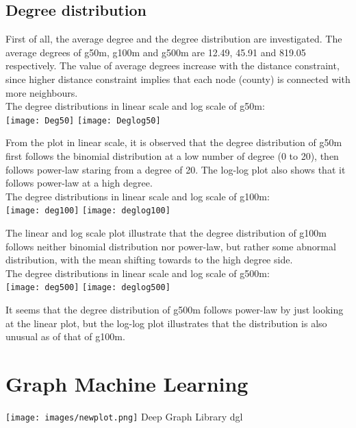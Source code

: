 \subsection{Degree distribution}
First of all, the average degree and the degree distribution are investigated. The average degrees of g50m, g100m and g500m are 12.49, 45.91 and 819.05 respectively. The value of average degrees increase with the distance constraint, since higher distance constraint implies that each node (county) is connected with more neighbours. \\

The degree distributions in linear scale and log scale of g50m:\\
\texttt{[image: Deg50]}
\texttt{[image: Deglog50]}

From the plot in linear scale, it is observed that the degree distribution of g50m first follows the binomial distribution at a low number of degree (0 to 20), then follows power-law staring from a degree of 20. The log-log plot also shows that it follows power-law at a high degree. \\

The degree distributions in linear scale and log scale of g100m:\\
\texttt{[image: deg100]}
\texttt{[image: deglog100]}

The linear and log scale plot illustrate that the degree distribution of g100m follows neither binomial distribution nor power-law, but rather some abnormal distribution, with the mean shifting towards to the high degree side. \\

The degree distributions in linear scale and log scale of g500m:\\
\texttt{[image: deg500]}
\texttt{[image: deglog500]}

It seems that the degree distribution of g500m follows power-law by just looking at the linear plot, but the log-log plot illustrates that the distribution is also unusual as of that of g100m. \\


 \section{Graph Machine Learning}
\texttt{[image: images/newplot.png]}
Deep Graph Library dgl


